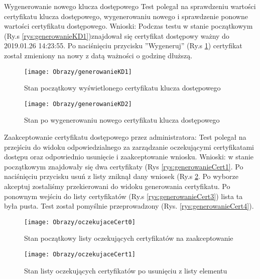 \begin{enumerate*}
	\item Wygenerowanie nowego klucza dostępowego\newline
	Test polegał na sprawdzeniu wartości certyfikatu klucza dostępowego, wygenerowaniu nowego i sprawdzenie ponowne wartości certyfikatu dostępowego.
	Wnioski: Podczas testu w stanie początkowym (Ry.s \ref{rys:generowanieKD1})znajdował się certyfikat dostępowy ważny do 2019.01.26 14:23:55. Po naciśnięciu przycisku ''Wygeneruj''  (Ry.s \ref{rys:generowanieKD2}) certyfikat został zmieniony na nowy z datą ważności o godzinę dłuższą.	
	\begin{figure}[ht!]
		\centering
		\begin{minipage}{0.3\textwidth}
			\texttt{[image: Obrazy/generowanieKD1]}
			\caption{Stan początkowy wyświetlonego certyfikatu klucza dostępowego }
			\label{rys:generowanieKD1}
		\end{minipage}
	\hspace{0.2\textwidth}
		\begin{minipage}{0.3\textwidth}
			\texttt{[image: Obrazy/generowanieKD2]}
			\caption{Stan po wygenerowaniu nowego certyfikatu klucza dostępowego}
			\label{rys:generowanieKD2}
		\end{minipage}
	\end{figure}
	
	\item  Zaakceptowanie certyfikatu dostępowego przez administratora: \newline
	Test polegał na przejściu do widoku odpowiedzialnego za zarządzanie oczekującymi certyfikatami dostępu oraz odpowiednio usunięcie i zaakceptowanie wniosku.
	\newline Wnioski: w stanie początkowym znajdowały się dwa certyfikaty (Rys \ref{rys:generowanieCert1}. Po naciśnięciu przycisku usuń z listy zniknął dany wniosek (Ry.s \ref{rys:generowanieCert2}. Po wyborze akceptuj zostaliśmy przekierowani do widoku generowania certyfikatu. Po ponownym wejściu do listy certyfikatów (Ry.s \ref{rys:generowanieCert3}) lista ta była pusta. Test został pomyślnie przeprowadzony (Rys. \ref{rys:generowanieCert4}). 
		\begin{figure}[ht!]
		\begin{minipage}{0.3\textwidth}
			\texttt{[image: Obrazy/oczekujaceCert0]}
			\caption{Stan początkowy listy oczekujących certyfikatów na zaakceptowanie }
			\label{rys:generowanieCert1}
		\end{minipage}
		\begin{minipage}{0.3\textwidth}
			\texttt{[image: Obrazy/oczekujaceCert1]}
			\caption{Stan listy oczekujących certyfikatów po usunięciu z listy elementu}
			\label{rys:generowanieCert2}
		\end{minipage}
		

\end{figure}
\end{enumerate*}
